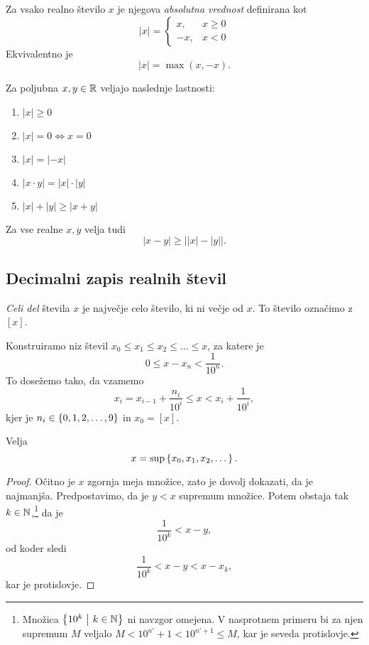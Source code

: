 \documentclass[12pt, a4paper]{article}
\begin{document}
\begin{definicija}
Za vsako realno število $x$ je njegova \emph{absolutna vrednost} definirana kot
\[
|x|=\begin{cases}
x, &x\geq 0\\
-x, &x<0\end{cases}
\]
Ekvivalentno je
\[
|x|=\max(x,-x).
\] 
\end{definicija}

\begin{posledica}
Za poljubna $x,y\in\mathbb{R}$ veljajo naslednje lastnosti:

\begin{enumerate}
\item $|x|\geq 0$
\item $|x|=0\iff x=0$
\item $|x|=|-x|$
\item $|x\cdot y|=|x|\cdot|y|$
\item $|x|+|y|\geq |x+y|$
\end{enumerate}
\end{posledica}

\begin{opomba}
Za vse realne $x,y$ velja tudi
\[|x-y|\geq\left||x|-|y|\right|.\]
\end{opomba}

\newpage

\subsection{Decimalni zapis realnih števil}

\begin{definicija}
\emph{Celi del} števila $x$ je največje celo število, ki ni večje od $x$. To število označimo z $[x]$.
\end{definicija}

Konstruiramo niz števil $x_0\leq x_1\leq x_2\leq\dots\leq x$, za katere je
\[
0\leq x-x_n<\frac{1}{10^n}.
\]
To dosežemo tako, da vzamemo
\[
x_i=x_{i-1}+\frac{n_i}{10^i}\leq x<x_i+\frac{1}{10^i},
\]
kjer je $n_i\in\left\{0,1,2,\dots,9\right\}$ in $x_0=[x]$.

\begin{trditev}
Velja
\[
x=\sup\left\{x_0,x_1,x_2,\dots\right\}.
\]
\end{trditev}

\begin{proof}
Očitno je $x$ zgornja meja množice, zato je dovolj dokazati, da je najmanjša. Predpostavimo, da je $y<x$ supremum množice. Potem obstaja tak $k\in\mathbb{N}$,\footnote{Množica $\left\{10^k~\middle\vert~k\in\mathbb{N}\right\}$ ni navzgor omejena. V nasprotnem primeru bi za njen supremum $M$ veljalo $M<10^{n'}+1<10^{n'+1}\leq M$, kar je seveda protislovje.} da je
\[
\frac{1}{10^k}<x-y,
\]
od koder sledi
\[
\frac{1}{10^k}<x-y<x-x_k,
\]
kar je protislovje.
\end{proof}
\end{document}
